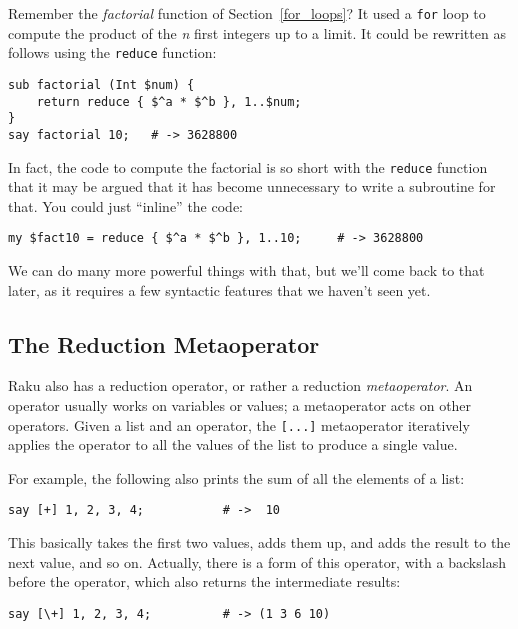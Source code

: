 Remember the \emph{factorial} function of Section~\ref{for_loops}? 
It used a {\tt for} loop to compute the product of the \emph{n} first 
integers up to a limit. It could be rewritten as follows using the 
{\tt reduce} function:

\begin{verbatim}
sub factorial (Int $num) { 
    return reduce { $^a * $^b }, 1..$num;
}
say factorial 10;   # -> 3628800
\end{verbatim}
%
In fact, the code to compute the factorial is so short with 
the {\tt reduce} function that it may be argued that it has 
become unnecessary to write a subroutine for that. You could 
just ``inline'' the code:

\begin{verbatim}
my $fact10 = reduce { $^a * $^b }, 1..10;     # -> 3628800
\end{verbatim}
%

We can do many more powerful things with that, but we'll come 
back to that later, as it requires a few syntactic features that 
we haven't seen yet.

\subsection{The Reduction Metaoperator}

Raku also has a reduction operator, 
or rather a reduction \emph{metaoperator}. An operator 
usually works on variables or values; a metaoperator acts 
on other operators. Given a list and an operator, the 
\verb'[...]' metaoperator iteratively applies the operator 
to all the values of the list to produce a single value.

For example, the following also prints the sum of all the 
elements of a list:

\begin{verbatim}
say [+] 1, 2, 3, 4;           # ->  10
\end{verbatim}

This basically takes the first two values, adds them up, 
and adds the result to the next value, and so on. Actually, 
there is a form of this operator, with a backslash before 
the operator, which also returns the intermediate results:

\begin{verbatim}
say [\+] 1, 2, 3, 4;          # -> (1 3 6 10)
\end{verbatim}

